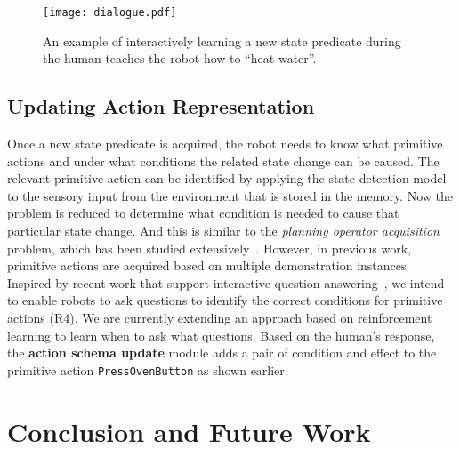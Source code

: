 \documentclass[letterpaper]{article} %
\begin{document}
\begin{figure}
\texttt{[image: dialogue.pdf]}
\centering
\vspace{-10pt}
\caption{An example of interactively learning a new state predicate during the human teaches the robot how to  ``heat water''.}
\label{fig:dialogue}
\vspace{-5pt}
\end{figure}


\subsection{Updating Action Representation}


Once a new state predicate is acquired, the robot needs to know what primitive actions and under what conditions the related state change can be caused. 
The relevant primitive action can be identified by applying the state detection model to the sensory input from the environment that is stored in the memory. Now the problem is reduced to determine what condition is needed to cause that particular state change. And this is similar to the {\it planning operator acquisition} problem, which has been studied extensively~\cite{wang1995learning,amir2008learning,Mourao12,zhuo2014action}. However, in previous work, primitive actions are acquired based on multiple demonstration instances. Inspired by recent work that support interactive question answering~\cite{cakmak2012,she2017interactive}, we intend to enable robots to ask questions to identify the correct conditions for primitive actions (R4). We are currently extending an approach based on reinforcement learning to learn when to ask what questions. Based on the human's response, the {\bf action schema update} module adds a pair of condition and effect to the primitive action \texttt{PressOvenButton} as shown earlier. 

\section{Conclusion and Future Work}
\end{document}
